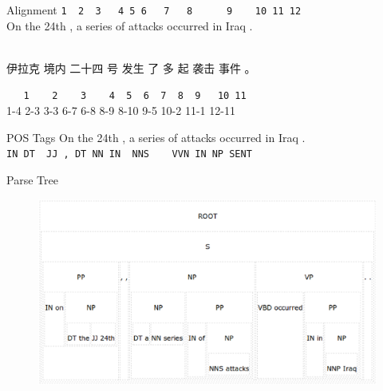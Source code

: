 \documentclass[18pt]{beamer}
\begin{document}
\begin{frame}[fragile]{Alignment}
\verb|1  2  3   4 5 6   7   8      9    10 11 12| \\
On the 24th , a series of attacks occurred in Iraq .\\

\begin{CJK}{UTF8}{gbsn} \\
伊拉克 境内 二十四 号 发生 了 多 起 袭击 事件 。
\end{CJK}
\verb|   1    2    3    4  5  6  7  8  9   10 11| \\
\vspace{1cm}
1-4 2-3 3-3 6-7 6-8 8-9 8-10 9-5 10-2 11-1 12-11
\end{frame}

\begin{frame}[fragile]{POS Tags}
On the 24th , a series of attacks occurred in Iraq .\\
\vspace{0.5cm}
\verb|IN DT  JJ , DT NN IN  NNS    VVN IN NP SENT| \\
\end{frame}

\begin{frame}{Parse Tree}
\begin{figure}
\centering
\includegraphics[scale=0.36]{tree.eps}
\end{figure}
\end{frame}
\end{document}
